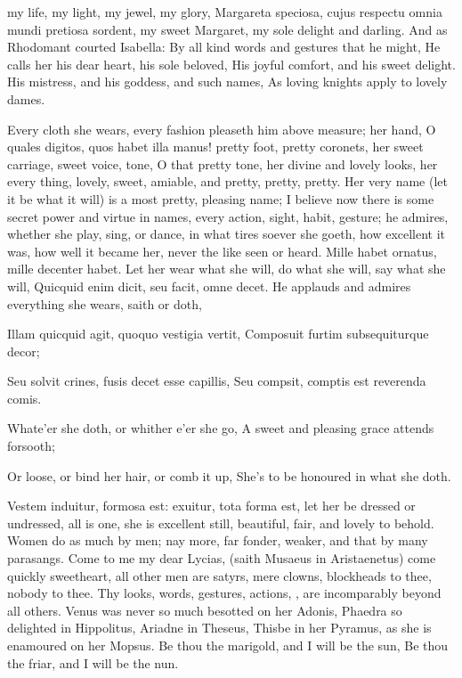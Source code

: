 my life, my light, my jewel, my glory, Margareta speciosa, cujus
respectu omnia mundi pretiosa sordent, my sweet Margaret, my sole
delight and darling. And as Rhodomant courted Isabella:
By all kind words and gestures that he might,
He calls her his dear heart, his sole beloved,
His joyful comfort, and his sweet delight.
His mistress, and his goddess, and such names,
As loving knights apply to lovely dames.

Every cloth she wears, every fashion pleaseth him above measure; her
hand, O quales digitos, quos habet illa manus! pretty foot, pretty
coronets, her sweet carriage, sweet voice, tone, O that pretty tone,
her divine and lovely looks, her every thing, lovely, sweet, amiable,
and pretty, pretty, pretty. Her very name (let it be what it will) is a
most pretty, pleasing name; I believe now there is some secret power
and virtue in names, every action, sight, habit, gesture; he admires,
whether she play, sing, or dance, in what tires soever she goeth, how
excellent it was, how well it became her, never the like seen or heard.
Mille habet ornatus, mille decenter habet. Let her wear what she
will, do what she will, say what she will, Quicquid enim dicit,
seu facit, omne decet. He applauds and admires everything she wears,
saith or doth,

Illam quicquid agit, quoquo vestigia vertit,
Composuit furtim subsequiturque decor;

Seu solvit crines, fusis decet esse capillis,
Seu compsit, comptis est reverenda comis.


Whate'er she doth, or whither e'er she go,
A sweet and pleasing grace attends forsooth;

Or loose, or bind her hair, or comb it up,
She's to be honoured in what she doth.

Vestem induitur, formosa est: exuitur, tota forma est, let her be
dressed or undressed, all is one, she is excellent still, beautiful,
fair, and lovely to behold. Women do as much by men; nay more, far
fonder, weaker, and that by many parasangs. Come to me my dear Lycias,
(saith Musaeus in Aristaenetus) come quickly sweetheart, all
other men are satyrs, mere clowns, blockheads to thee, nobody to thee.
Thy looks, words, gestures, actions, \etc{}, are incomparably beyond all
others. Venus was never so much besotted on her Adonis, Phaedra so
delighted in Hippolitus, Ariadne in Theseus, Thisbe in her Pyramus, as
she is enamoured on her Mopsus.
Be thou the marigold, and I will be the sun,
Be thou the friar, and I will be the nun.

